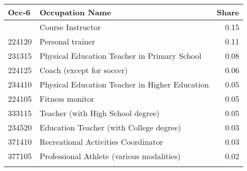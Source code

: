 \begin{tabularx}{\textwidth}{llr}
\toprule
{Occ-6}&{Occupation Name}&{Share} \tabularnewline
\midrule\addlinespace[1.5ex]
333110&Course Instructor&0.15 \tabularnewline
224120&Personal trainer&0.11 \tabularnewline
231315&Physical Education Teacher in Primary School&0.08 \tabularnewline
224125&Coach (except for soccer)&0.06 \tabularnewline
234410&Physical Education Teacher in Higher Education \hspace{2.12cm} &0.05 \tabularnewline
224105&Fitness monitor&0.05 \tabularnewline
333115&Teacher (with High School degree)&0.05 \tabularnewline
234520&Education Teacher (with College degree) & 0.03 \tabularnewline
371410&Recreational Activities Coordinator&0.03 \tabularnewline
377105&Professional Athlete (various modalities)&0.02 \tabularnewline
\bottomrule \addlinespace[1.5ex]
\end{tabularx}

